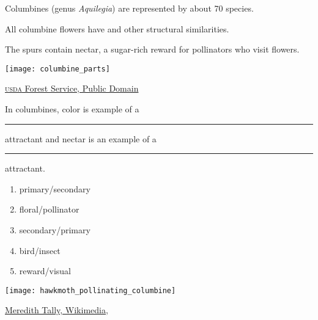 \documentclass[t,hidelinks]{beamer}
\newcommand{\ques}[1]{\highlight{\textsc{q#1:}}}
\begin{document}
%
\begin{frame}[t]{Columbines (genus \textit{Aquilegia}) are represented by about 70 species.}
	
	\begin{multicols}{2}
	\hangpara All columbine flowers have  and other structural similarities.
	
	\hangpara The spurs contain nectar, a sugar-rich reward for pollinators who visit flowers.  

	\columnbreak
	
		\texttt{[image: columbine\_parts]}
	\end{multicols}
	
	\vfilll
	
	\hfill \tiny \href{https://www.fs.fed.us/wildflowers/beauty/columbines/flower.shtml}{\textsc{usda} Forest Service, Public Domain}
\end{frame}
%
\begin{frame}[t]{\ques2 In columbines, color is example of a \rule{0.5in}{0.4pt} attractant and nectar is an example of a \rule{0.5in}{0.4pt} attractant.}

	\begin{multicols}{2}
	\begin{enumerate}
		\item primary/secondary
		\item floral/pollinator
		\item \alert<2>{secondary/primary}
		\item bird/insect
		\item reward/visual
	\end{enumerate}

	\columnbreak
	
		\texttt{[image: hawkmoth\_pollinating\_columbine]}
	\end{multicols}
	
	\vfilll
	
	\hfill \tiny \href{https://commons.wikimedia.org/wiki/File:Whitelined_Sphinx_Hummingbird_Moth_Colorado.JPG}{Meredith Tally, Wikimedia, }
\end{frame}
%
\end{document}
